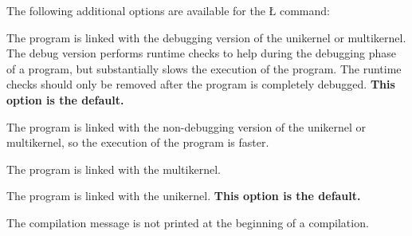 \documentclass[openright,twoside]{report}
\begin{document}
The following additional options are available for the \LGinlinetrue\LGbegin\lgrinde\L{}\endlgrinde\LGend{} command:
\begin{prefix}
\item[\LGinlinetrue\LGbegin\lgrinde\L{\LB{\-\V{debug}}}\endlgrinde\LGend{}]
%
The program is linked with the debugging version of the unikernel or multikernel.
The debug version performs runtime checks to help during the debugging phase of a \uC program, but substantially slows the execution of the program.
The runtime checks should only be removed after the program is completely debugged.
\textbf{This option is the default.}

\item[\LGinlinetrue\LGbegin\lgrinde\L{\LB{\-\V{nodebug}}}\endlgrinde\LGend{}]
%
The program is linked with the non-debugging version of the unikernel or multikernel, so the execution of the program is faster.

\item[\LGinlinetrue\LGbegin\lgrinde\L{\LB{\-\V{multi}}}\endlgrinde\LGend{}]
%
The program is linked with the multikernel.

\item[\LGinlinetrue\LGbegin\lgrinde\L{\LB{\-\V{nomulti}}}\endlgrinde\LGend{}]
%
The program is linked with the unikernel.
\textbf{This option is the default.}

\item[\LGinlinetrue\LGbegin\lgrinde\L{\LB{\-\V{quiet}}}\endlgrinde\LGend{}]
%
The \uC compilation message is not printed at the beginning of a compilation.


\end{prefix}
\end{document}
